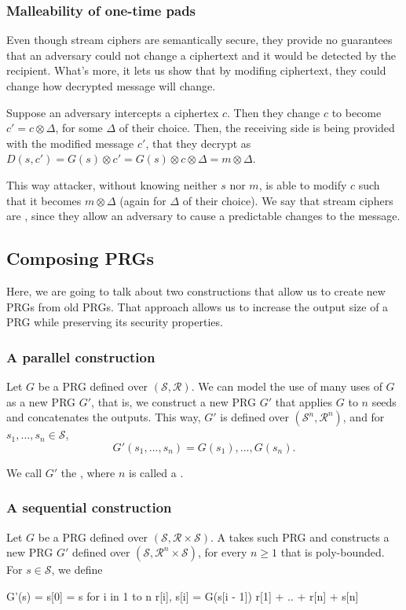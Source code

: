\documentclass[a4paper,10pt]{article}
\newcommand{\cll}[1]{\mathcal{#1}}
\newcommand{\xor}{\otimes}
\newenvironment{code}{\list{}{\rightmargin\leftmargin}\item\relax\endgraf\verbatim}{\endverbatim\endlist}
\begin{document}
\subsubsection{Malleability of one-time pads}
Even though stream ciphers are semantically secure, they provide no guarantees
that an adversary could not change a ciphertext and it would be detected by the
recipient. What's more, it lets us show that by modifing ciphertext, they could
change how decrypted message will change.

Suppose an adversary intercepts a ciphertex $c$. Then they change $c$ to become
$c' = c \xor \Delta$, for some $\Delta$ of their choice. Then, the receiving side
is being provided with the modified message $c'$, that they decrypt as
$D(s,c') = G(s) \xor c' = G(s) \xor c \xor \Delta = m \xor \Delta$.

This way attacker, without knowing neither $s$ nor $m$, is able to modify $c$
such that it becomes $m \xor \Delta$ (again for $\Delta$ of their choice). We
say that stream ciphers are , since they allow an adversary to
cause a predictable changes to the message.

\subsection{Composing PRGs}
Here, we are going to talk about two constructions that allow us to create new
PRGs from old PRGs. That approach allows us to increase the output size of a
PRG while preserving its security properties.

\subsubsection{A parallel construction}
Let $G$ be a PRG defined over $\cll{(S,R)}$. We can model the use of many uses
of $G$ as a new PRG $G'$, that is, we construct a new PRG $G'$ that applies $G$
to $n$ seeds and concatenates the outputs. This way, $G'$ is defined over
$(\cll{S}^n,\cll{R}^n)$, and for $s_1, ..., s_n \in \cll{S}$,
\[
  G'(s_1, ..., s_n) = G(s_1), ..., G(s_n)\text{.}
\]

We call $G'$ the , where $n$ is called
a .

\subsubsection{A sequential construction}
Let $G$ be a PRG defined over $\cll{(S,R \times S)}$. A 
takes such PRG and constructs a new PRG $G'$ defined over $(\cll{S},\cll{R}^n \times \cll{S})$,
for every $n \geq 1$ that is poly-bounded. For $s \in \cll{S}$, we define
\begin{code}
G'(s) =
  s[0] = s
  for i in 1 to n
    r[i], s[i] = G(s[i - 1])
  r[1] + .. + r[n] + s[n]
\end{code}
\end{document}

